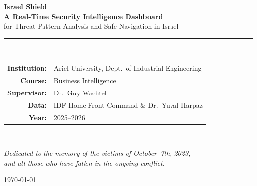 \documentclass[12pt,a4paper]{article}
\begin{document}

\begin{titlepage}
\centering\vspace*{1cm}


\vspace{0.7cm}
{\Huge\bfseries\color{israelblue} Israel Shield}\\[0.35cm]
{\Large\bfseries A Real-Time Security Intelligence Dashboard}\\[0.25cm]
{\large for Threat Pattern Analysis and Safe Navigation in Israel}

\vspace{1cm}\rule{0.68\linewidth}{0.4pt}\\[0.3cm]
\begin{tabular}{rl}
  \textbf{Institution:} & Ariel University, Dept.\ of Industrial Engineering \\
  \textbf{Course:}      & Business Intelligence \\
  \textbf{Supervisor:}  & Dr.\ Guy Wachtel \\
  \textbf{Data:}        & IDF Home Front Command \& Dr.\ Yuval Harpaz \\
  \textbf{Year:}        & 2025--2026 \\
\end{tabular}

\vspace{1.1cm}\rule{0.68\linewidth}{0.4pt}\\[0.8cm]
\textit{Dedicated to the memory of the victims of October~7th, 2023,\\
and all those who have fallen in the ongoing conflict.}

\vfill\today
\end{titlepage}
\end{document}
